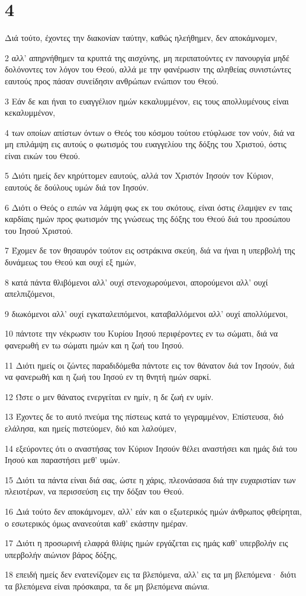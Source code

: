 \chapter{4}

\par Διά τούτο, έχοντες την διακονίαν ταύτην, καθώς ηλεήθημεν, δεν αποκάμνομεν,
\par 2 αλλ' απηρνήθημεν τα κρυπτά της αισχύνης, μη περιπατούντες εν πανουργία μηδέ δολόνοντες τον λόγον του Θεού, αλλά με την φανέρωσιν της αληθείας συνιστώντες εαυτούς προς πάσαν συνείδησιν ανθρώπων ενώπιον του Θεού.
\par 3 Εάν δε και ήναι το ευαγγέλιον ημών κεκαλυμμένον, εις τους απολλυμένους είναι κεκαλυμμένον,
\par 4 των οποίων απίστων όντων ο Θεός του κόσμου τούτου ετύφλωσε τον νούν, διά να μη επιλάμψη εις αυτούς ο φωτισμός του ευαγγελίου της δόξης του Χριστού, όστις είναι εικών του Θεού.
\par 5 Διότι ημείς δεν κηρύττομεν εαυτούς, αλλά τον Χριστόν Ιησούν τον Κύριον, εαυτούς δε δούλους υμών διά τον Ιησούν.
\par 6 Διότι ο Θεός ο ειπών να λάμψη φως εκ του σκότους, είναι όστις έλαμψεν εν ταις καρδίαις ημών προς φωτισμόν της γνώσεως της δόξης του Θεού διά του προσώπου του Ιησού Χριστού.
\par 7 Έχομεν δε τον θησαυρόν τούτον εις οστράκινα σκεύη, διά να ήναι η υπερβολή της δυνάμεως του Θεού και ουχί εξ ημών,
\par 8 κατά πάντα θλιβόμενοι αλλ' ουχί στενοχωρούμενοι, απορούμενοι αλλ' ουχί απελπιζόμενοι,
\par 9 διωκόμενοι αλλ' ουχί εγκαταλειπόμενοι, καταβαλλόμενοι αλλ' ουχί απολλύμενοι,
\par 10 πάντοτε την νέκρωσιν του Κυρίου Ιησού περιφέροντες εν τω σώματι, διά να φανερωθή εν τω σώματι ημών και η ζωή του Ιησού.
\par 11 Διότι ημείς οι ζώντες παραδιδόμεθα πάντοτε εις τον θάνατον διά τον Ιησούν, διά να φανερωθή και η ζωή του Ιησού εν τη θνητή ημών σαρκί.
\par 12 Ώστε ο μεν θάνατος ενεργείται εν ημίν, η δε ζωή εν υμίν.
\par 13 Έχοντες δε το αυτό πνεύμα της πίστεως κατά το γεγραμμένον, Επίστευσα, διό ελάλησα, και ημείς πιστεύομεν, διό και λαλούμεν,
\par 14 εξεύροντες ότι ο αναστήσας τον Κύριον Ιησούν θέλει αναστήσει και ημάς διά του Ιησού και παραστήσει μεθ' υμών.
\par 15 Διότι τα πάντα είναι διά σας, ώστε η χάρις, πλεονάσασα διά την ευχαριστίαν των πλειοτέρων, να περισσεύση εις την δόξαν του Θεού.
\par 16 Διά τούτο δεν αποκάμνομεν, αλλ' εάν και ο εξωτερικός ημών άνθρωπος φθείρηται, ο εσωτερικός όμως ανανεούται καθ' εκάστην ημέραν.
\par 17 Διότι η προσωρινή ελαφρά θλίψις ημών εργάζεται εις ημάς καθ' υπερβολήν εις υπερβολήν αιώνιον βάρος δόξης,
\par 18 επειδή ημείς δεν ενατενίζομεν εις τα βλεπόμενα, αλλ' εις τα μη βλεπόμενα· διότι τα βλεπόμενα είναι πρόσκαιρα, τα δε μη βλεπόμενα αιώνια.

